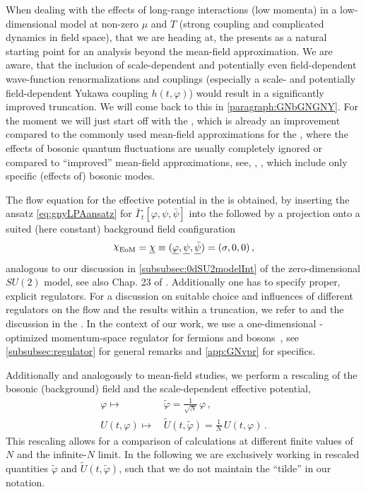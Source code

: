 When dealing with the effects of long-range interactions (low momenta) in a low-dimensional model at non-zero $\mu$ and $T$ (strong coupling and complicated dynamics in field space), that we are heading at, the \lpa{} presents as a natural starting point for an analysis beyond the mean-field approximation.
We are aware, that the inclusion of scale-dependent and potentially even field-dependent wave-function renormalizations and couplings (especially a scale- and potentially field-dependent Yukawa coupling $h ( t, \varphi )$) would result in a significantly improved truncation. We will come back to this in \cref{paragraph:GNbGNGNY}.
For the moment we will just start off with the \lpa{}, which is already an improvement compared to the commonly used mean-field approximations for the \gnyBm{}, where the effects of bosonic quantum fluctuations are usually completely ignored or compared to ``improved'' mean-field approximations, see, \eg{}, , which include only specific (effects of) bosonic modes{}.\bigskip
	
The \frg{} flow equation for the effective potential in the \lpa{} is obtained, by inserting the ansatz \eqref{eq:gnyLPAansatz} for $\bar{\Gamma}_t [\varphi, \psi, \bar{\psi}]$ into the \frgEq{} followed by a projection onto a suited (here constant) background field configuration
\begin{align}
	\FSsfEoM{}=\MFEchi{}\equiv (\MFEphi,\MFEpsi,\MFEpsib)=(\sigma,0,0)\, ,\label{eq:GNYVEV}
\end{align}
analogous to our discussion in \cref{subsubsec:0dSU2modelInt} of the zero-dimensional $SU(2)$ model, see also Chap. 23 of .
Additionally one has to specify proper, explicit regulators.
For a discussion on suitable choice and influences of different regulators on the \frg{} flow and the \ir{} results within a truncation, we refer to  and the discussion in the .
In the context of our work, we use a one-dimensional \lpa{}-optimized momentum-space regulator for fermions and bosons~\cite{Litim:2000ci,Litim:2001up}, see \cref{subsubsec:regulator} for general remarks and \cref{app:GNvpr} for specifics.

Additionally and analogously to mean-field studies, we perform a rescaling of the bosonic (background) field and the scale-dependent effective potential,
\begin{subequations}\label{eq:rescaling_with_n}
\begin{align}
	\varphi \mapsto \, & \tilde{\varphi} = \tfrac{1}{\sqrt{N}} \, \varphi \, ,	\label{eq:rescaling_with_n_phi}
	\\
	U ( t, \varphi ) \mapsto \, & \tilde{U} ( t, \tilde{\varphi} ) = \tfrac{1}{N} \, U ( t, \varphi ) \, .\label{eq:rescaling_with_n_U}
\end{align}
\end{subequations}
This rescaling allows for a comparison of calculations at different finite values of $N$ and the infinite-$N$ limit.
In the following we are exclusively working in rescaled quantities $\tilde{\varphi}$ and $\tilde{U} ( t, \tilde{\varphi} )$, such that we do not maintain the ``tilde'' in our notation.
	
